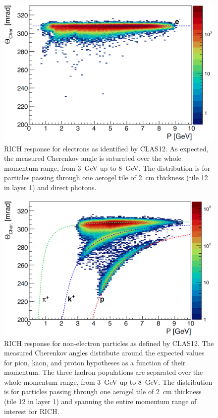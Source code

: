 \documentclass[5p,times,twocolumn]{elsarticle}
\begin{document}
\begin{figure}[t]
\begin{center}
\includegraphics[width=1.0\columnwidth]{Electron_PID.png}
\end{center}
\caption{RICH response for electrons as identified by CLAS12. As expected, the measured Cherenkov angle
  is saturated over the whole momentum range, from 3~GeV up to 8~GeV. The distribution is for particles passing
  through one aerogel tile of 2~cm thickness (tile 12 in layer 1) and direct photons.}
\label{Fig:CHele}
\end{figure}

\begin{figure}[t]
\begin{center}
\includegraphics[width=1.0\columnwidth]{Hadron_PID.png}
\end{center}
\caption{RICH response for non-electron particles as defined by CLAS12. The measured Cherenkov angles distribute
  around the expected values for pion, kaon, and proton hypotheses as a function of their momentum. The three hadron
  populations are separated over the whole momentum range, from 3~GeV up to 8~GeV. The distribution is for
  particles passing through one aerogel tile of 2~cm thickness (tile 12 in layer 1) and spanning the entire momentum
  range of interest for RICH.}
\label{Fig:CHhad1}
\end{figure}
\end{document}
